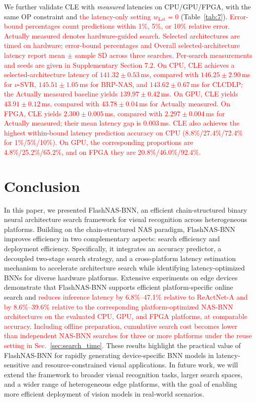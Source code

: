 \documentclass[a4paper,fleqn]{cas-sc}
\begin{document}
We further validate CLE with \emph{measured} latencies on CPU/GPU/FPGA, with the same OP constraint and \textcolor{red}{the latency-only setting $w_{\mathrm{Lat}}=0$} (Table~\ref{tab:7}).
\textcolor{red}{Error-bound percentages count predictions within 1\%, 5\%, or 10\% relative error. Actually measured denotes hardware-guided search. Selected architectures are timed on hardware; error-bound percentages and Overall selected-architecture latency report mean $\pm$ sample SD across three searches. Per-search measurements and seeds are given in Supplementary Section 7.2.}
\textcolor{red}{On CPU, CLE achieves a selected-architecture latency of $141.32\pm0.53$\,ms, compared with $146.25\pm2.90$\,ms for $\nu$-SVR, $145.51\pm1.05$\,ms for BRP-NAS, and $143.62\pm0.67$\,ms for CLCDLP; the Actually measured baseline yields $139.97\pm0.42$\,ms. On GPU, CLE yields $43.91\pm0.12$\,ms, compared with $43.78\pm0.04$\,ms for Actually measured. On FPGA, CLE yields $2.300\pm0.005$\,ms, compared with $2.297\pm0.004$\,ms for Actually measured; their mean latency gap is 0.003\,ms. CLE also achieves the highest within-bound latency prediction accuracy on CPU (8.8\%/27.4\%/72.4\% for 1\%/5\%/10\%). On GPU, the corresponding proportions are 4.8\%/25.2\%/65.2\%, and on FPGA they are 20.8\%/46.0\%/92.4\%.}


\section{Conclusion}
In this paper, we presented FlashNAS-BNN, an efficient chain-structured binary neural architecture search framework for visual recognition across heterogeneous platforms. Building on the chain-structured NAS paradigm, FlashNAS-BNN improves efficiency in two complementary aspects: search efficiency and deployment efficiency. Specifically, it integrates an accuracy predictor, a decoupled two-stage search strategy, and a cross-platform latency estimation mechanism to accelerate architecture search while identifying latency-optimized BNNs for diverse hardware platforms. Extensive experiments on edge devices demonstrate that FlashNAS-BNN supports efficient platform-specific online search and \textcolor{red}{reduces inference latency by 6.8\%--47.1\% relative to ReActNet-A and by 8.6\%--39.6\% relative to the corresponding platform-optimized NAS-BNN architectures on the evaluated CPU, GPU, and FPGA platforms, at comparable accuracy}. \textcolor{red}{Including offline preparation, cumulative search cost becomes lower than independent NAS-BNN searches for three or more platforms under the reuse setting in Sec.~\ref{sec:search_time}.} These results highlight the practical value of FlashNAS-BNN for rapidly generating device-specific BNN models in latency-sensitive and resource-constrained visual applications. In future work, we will extend the framework to broader visual recognition tasks, larger search spaces, and a wider range of heterogeneous edge platforms, with the goal of enabling more efficient deployment of vision models in real-world scenarios.
\end{document}
